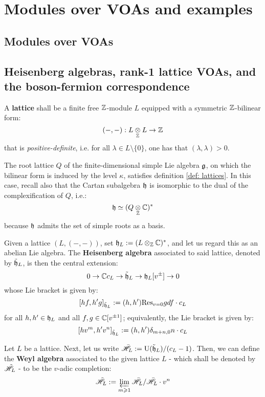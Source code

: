 \section{Modules over VOAs and examples}
    \subsection{Modules over VOAs}

    \subsection{Heisenberg algebras, rank-1 lattice VOAs, and the boson-fermion correspondence}
        \begin{definition}[Lattices] \label{def: lattices}
            A \textbf{lattice} shall be a finite free $\mathbb{Z}$-module $L$ equipped with a symmetric $\mathbb{Z}$-bilinear form:
                $$(-, -): L \tensor_{\Z} L \to \Z$$
            that is \textit{positive-definite}, i.e. for all $\lambda \in L \setminus \{0\}$, one has that $(\lambda, \lambda) > 0$.
        \end{definition}
        \begin{example}
            The root lattice $Q$ of the finite-dimensional simple Lie algebra $\mathfrak{g}$, on which the bilinear form is induced by the level $\kappa$, satisfies definition \ref{def: lattices}. In this case, recall also that the Cartan subalgebra $\mathfrak{h}$ is isomorphic to the dual of the complexification of $Q$, i.e.:
                $$\h \cong (Q \tensor_{\Z} \bbC)^*$$
            because $\mathfrak{h}$ admits the set of simple roots as a basis.
        \end{example}

        \begin{definition} \label{def: lattice_heisenberg_algebras} 
            Given a lattice $(L, (-, -))$, set $\h_L := (L \tensor_{\Z} \bbC)^*$, and let us regard this as an abelian Lie algebra. The \textbf{Heisenberg algebra} associated to said lattice, denoted by $\tilde{\mathfrak{h}}_L$, is then the central extension:
                $$0 \to \mathbb{C} c_L \to \tilde{\mathfrak{h}}_L \to \mathfrak{h}_L[v^{\pm}] \to 0$$
            whose Lie bracket is given by:
                $$[ h f, h' g ]_{\tilde{\mathfrak{h}}_L} := (h, h') \mathrm{Res}_{v = 0} g df \cdot c_L$$
            for all $h, h' \in \mathfrak{h}_L$ and all $f, g \in \mathbb{C}[v^{\pm 1}]$; equivalently, the Lie bracket is given by:
                $$[h v^m, h' v^n]_{\tilde{\mathfrak{h}}_L} := (h, h') \delta_{m + n, 0} n \cdot c_L$$
        \end{definition}
        \begin{definition} \label{def: lattice_weyl_algebras}
            Let $L$ be a lattice. Next, let us write $\bar{\mathscr{H}}_L := \mathrm{U}(\tilde{\mathfrak{h}}_L)/(c_L - 1)$. Then, we can define the \textbf{Weyl algebra} associated to the given lattice $L$ - which shall be denoted by $\tilde{\mathscr{H}}_L$ - to be the $v$-adic completion:
                $$\tilde{\mathscr{H}}_L := \varprojlim_{m \geqslant 1} \bar{\mathscr{H}}_L/\bar{\mathscr{H}}_L \cdot v^n$$
        \end{definition}

